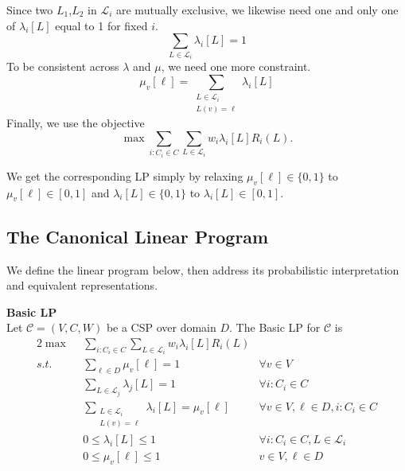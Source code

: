 Since two $L_1$,$L_2$ in $ \mathcal{L}_i$ are mutually exclusive, we likewise need one and only one of $\lambda_i[L]$ equal to 1 for fixed $i$.
\begin{equation*}
\sum_{L \in \mathcal{L}_i} \lambda_i[L] = 1 
\end{equation*}
To be consistent across $\lambda$ and $\mu$, we need one more constraint.
\begin{equation*}
\mu_v[\ell] = \sum_{\substack{ L \in \mathcal{L}_i \\ L(v) = \ell }} \lambda_i[L] 
\end{equation*}
Finally, we use the objective
\begin{equation*}
\max \sum_{i : C_i \in C} \sum_{L \in \mathcal{L}_i}   w_i\lambda_i[L] R_i(L).
\end{equation*}

We get the corresponding LP simply by relaxing $\mu_v[\ell] \in \{0,1\}$ to $\mu_v[\ell] \in [0,1]$ and $\lambda_i[L] \in \{0,1\}$ to $\lambda_i[L] \in [0,1]$.
\subsection{The Canonical Linear Program}

We define the linear program below, then address its probabilistic interpretation and equivalent representations.
\begin{definition}\textbf{Basic LP} \\
Let $\mathcal{C} = (V,C,W)$ be a CSP over domain $D$. The Basic LP for $\mathcal{C}$ is
\begin{alignat}{2}
\max ~&~ \sum_{i : C_i \in C} \sum_{L \in \mathcal{L}_i}   w_i\lambda_i[L] R_i(L) & \\
s.t. ~ & ~ \sum_{\ell \in D} \mu_v[\ell] = 1 & \forall v \in V  \label{eq:canonLPmuSum} \\
     ~ & ~ \sum_{L \in \mathcal{L}_j} \lambda_j[L] = 1  & \forall i : C_i \in C \label{eq:canonLPlambdaSum} \\
     ~ & ~ \sum_{\substack{ L \in \mathcal{L}_i \\ L(v) = \ell }} \lambda_i[L] = \mu_v[\ell]  & \forall v \in V, \ell \in D, i : C_i \in C \label{eq:canonLPConsistency} \\
     ~ & ~ 0 \leq \lambda_i[L] \leq 1  & \forall  i : C_i \in C, L \in \mathcal{L}_i  \label{eq:canonLPlambdaNonNeg} \\
     ~ & ~ 0 \leq \mu_v[\ell] \leq 1 & v \in V, \ell \in D \label{eq:canonLPmuNonNeg}
\end{alignat}
\end{definition}

